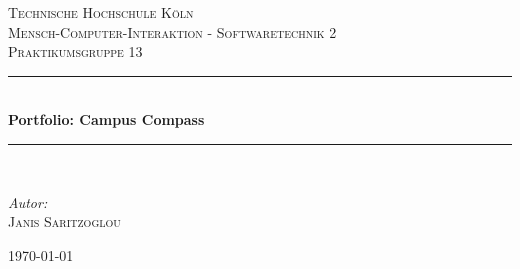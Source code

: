 \begin{titlepage}
\begin{center}

\textsc{\LARGE Technische Hochschule Köln}\\[1.5cm] %
\textsc{\Large Mensch-Computer-Interaktion - Softwaretechnik 2}\\[0.5cm] %
\textsc{\large Praktikumsgruppe 13}\\[0.5cm] %

\newcommand{\HRule}{\rule{\linewidth}{0.5mm}}
\HRule \\[0.4cm]
{ \huge \bfseries Portfolio: Campus Compass}\\[0.4cm]
\HRule \\[1.5cm]
\begin{minipage}{0.3\textwidth}
\begin{flushleft} \large
\emph{Autor:}\\
\textsc{Janis Saritzoglou}
\end{flushleft}
\end{minipage}
\hfill

\vfill
{\large \today}
\end{center}
\end{titlepage}